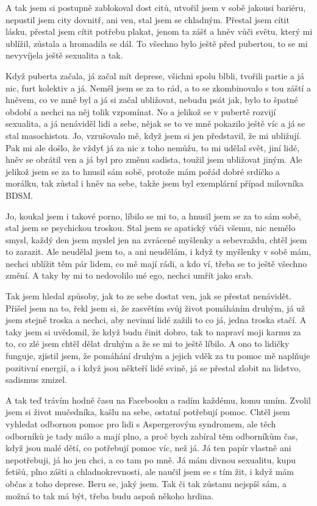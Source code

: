 \documentclass[DIV=calc, paper=a4, fontsize=11pt, twocolumn]{scrartcl}	 %
\begin{document}
A tak jsem si postupně zablokoval dost citů, utvořil jsem v sobě
jakousi bariéru, nepustil jsem city dovnitř, ani ven, stal jsem se
chladným. Přestal jsem cítit lásku, přestal jsem cítit potřebu plakat,
jenom ta zášť a hněv vůči světu, který mi ublížil, zůstala a hromadila
se dál. To všechno bylo ještě před pubertou, to se mi nevyvíjela ještě
sexualita a tak.

Když puberta začala, já začal mít deprese, všichni spolu blbli,
tvořili partie a já nic, furt kolektiv a já. Neměl jsem se za to rád,
a to se zkombinovalo s tou záští a hněvem, co ve mně byl a já si začal
ubližovat, nebudu psát jak, bylo to špatné období a nechci na něj
tolik vzpomínat. No a jelikož se v pubertě rozvijí sexualita, a já
nenáviděl lidi a sebe, nějak se to ve mně pokazilo ještě víc a já se
stal masochistou. Jo, vzrušovalo mě, když jsem si jen představil, že
mi ubližují. Pak mi ale došlo, že vždyť já za nic z toho nemůžu, to mi
udělal svět, jiní lidé, hněv se obrátil ven a já byl pro změnu
sadista, toužil jsem ubližovat jiným. Ale jelikož jsem se za to hnusil
sám sobě, protože mám pořád dobré srdíčko a morálku, tak zůstal i hněv
na sebe, takže jsem byl exemplární případ milovníka BDSM.

Jo, koukal jsem i takové porno, líbilo se mi to, a hnusil jsem se za
to sám sobě, stal jsem se psychickou troskou. Stal jsem se apatický
vůči všemu, nic nemělo smysl, každý den jsem myslel jen na zvrácené
myšlenky a sebevraždu, chtěl jsem to zarazit. Ale neudělal jsem to, a
ani neudělám, i když ty myšlenky v sobě mám, nechci ublížit těm pár
lidem, co mě mají rádi, a kdo ví, třeba se to ještě všechno změní. A
taky by mi to nedovolilo mé ego, nechci umřít jako srab.

Tak jsem hledal způsoby, jak to ze sebe dostat ven, jak se přestat
nenávidět. Přišel jsem na to, řekl jsem si, že zasvětím svůj život
pomáháním druhým, já už jsem stejně troska a nechci, aby nevinní lidé
zažili to co já, jedna troska stačí. A taky jsem si uvědomil, že když
budu činit dobro, tak to napraví moji karmu za to, co zlé jsem chtěl
dělat druhým a že se mi to ještě líbilo. A ono to lidičky funguje,
zjistil jsem, že pomáhání druhým a jejich vděk za tu pomoc mě naplňuje
pozitivní energií, a i když jsou někteří lidé svině, já se přestal
zlobit na lidstvo, sadismus zmizel.

A tak teď trávím hodně času na Facebooku a radím každému, komu
umím. Zvolil jsem si život mučedníka, kašlu na sebe, ostatní potřebují
pomoc. Chtěl jsem vyhledat odbornou pomoc pro lidi s Aspergerovým
syndromem, ale těch odborníků je tady málo a mají plno, a proč bych
zabíral těm odborníkům čas, když jsou malé dětí, co potřebují pomoc
víc, než já. Já ten papír vlastně ani nepotřebuji, já ho jen chci, a
co tam po mně. Já mám divnou sexualitu, kupu fetišů, plno zášti a
chladnokrevnosti, ale naučil jsem se s tím žit, i když mám občas z
toho deprese. Beru se, jaký jsem. Tak či tak zůstanu nejspíš sám, a
možná to tak má být, třeba budu aspoň někoho hrdina.
\end{document}
